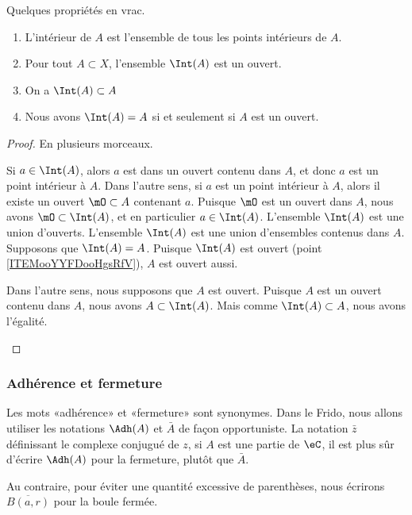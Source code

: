\begin{lemma}
	Quelques propriétés en vrac.
	\begin{enumerate}
		\item   \label{ITEMooHLIMooJEacKt}
		      L'intérieur de \( A\) est l'ensemble de tous les points intérieurs de \( A\).
		\item \label{ITEMooYTXSooMyiBpMgzK}
		      Pour tout \( A \subset X\), l'ensemble \( \Int(A)\) est un ouvert.
		\item   \label{ITEMooYYFDooHgsRfV}
		      On a  \( \Int(A) \subset A \)
		\item \label{ITEMooTDXFooFdyLeO}
		      Nous avons \( \Int(A) = A \) si et seulement si \( A\) est un ouvert.
	\end{enumerate}
\end{lemma}

\begin{proof}
	En plusieurs morceaux.
	\begin{subproof}
		\spitem[\ref{ITEMooHLIMooJEacKt}]
		Si \( a\in\Int(A)\), alors \( a\) est dans un ouvert contenu dans \( A\), et donc \( a\) est un point intérieur à \( A\). Dans l'autre sens, si \( a\) est un point intérieur à \( A\), alors il existe un ouvert \( \mO\subset A\) contenant \( a\). Puisque \( \mO\) est un ouvert dans \( A\), nous avons \( \mO\subset\Int(A)\), et en particulier \( a\in \Int(A)\).
		\spitem[\ref{ITEMooYTXSooMyiBpMgzK}]
		L'ensemble \( \Int(A)\) est une union d'ouverts.
		\spitem[\ref{ITEMooYYFDooHgsRfV}]
		L'ensemble \( \Int(A)\) est une union d'ensembles contenus dans \( A\).
		\spitem[\ref{ITEMooTDXFooFdyLeO}]
		Supposons que \( \Int(A)=A\). Puisque \( \Int(A)\) est ouvert (point \ref{ITEMooYYFDooHgsRfV}), \( A\) est ouvert aussi.

		Dans l'autre sens, nous supposons que \( A\) est ouvert. Puisque \( A\) est un ouvert contenu dans \( A\), nous avons \( A\subset\Int(A)\). Mais comme \( \Int(A)\subset A\), nous avons l'égalité.
	\end{subproof}
\end{proof}

\subsubsection{Adhérence et fermeture}

\begin{normaltext}
	Les mots «adhérence» et «fermeture» sont synonymes. Dans le Frido, nous allons utiliser les notations \( \Adh(A)\) et \( \bar A\) de façon opportuniste. La notation \( \bar z\) définissant le complexe conjugué de \( z\), si \( A\) est une partie de \( \eC\), il est plus sûr d'écrire \( \Adh(A)\) pour la fermeture, plutôt que \( \bar A\).

	Au contraire, pour éviter une quantité excessive de parenthèses, nous écrirons \( \overline{ B(a,r) }\) pour la boule fermée.
\end{normaltext}

